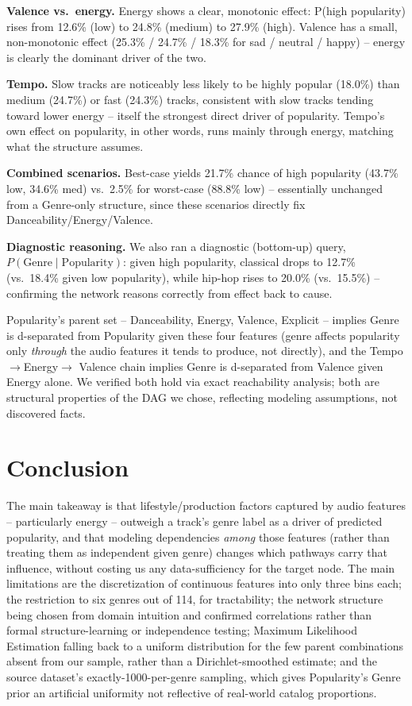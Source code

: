 \documentclass[letterpaper]{article}
\begin{document}
\textbf{Valence vs.\ energy.} Energy shows a clear, monotonic effect:
P(high popularity) rises from 12.6\% (low) to 24.8\% (medium) to 27.9\%
(high). Valence has a small, non-monotonic effect (25.3\% / 24.7\% / 18.3\%
for sad / neutral / happy) -- energy is clearly the dominant driver of the
two.

\textbf{Tempo.} Slow tracks are noticeably less likely to be highly popular
(18.0\%) than medium (24.7\%) or fast (24.3\%) tracks, consistent with slow
tracks tending toward lower energy -- itself the strongest direct driver
of popularity. Tempo's own effect on popularity, in other words, runs
mainly through energy, matching what the structure assumes.

\textbf{Combined scenarios.} Best-case yields 21.7\% chance of high
popularity (43.7\% low, 34.6\% med) vs.\ 2.5\% for worst-case (88.8\% low)
-- essentially unchanged from a Genre-only structure, since these
scenarios directly fix Danceability/Energy/Valence.

\textbf{Diagnostic reasoning.} We also ran a diagnostic (bottom-up) query,
$P(\text{Genre} \mid \text{Popularity})$: given high popularity, classical
drops to 12.7\% (vs.\ 18.4\% given low popularity), while hip-hop rises to
20.0\% (vs.\ 15.5\%) -- confirming the network reasons correctly from
effect back to cause.

Popularity's parent set -- Danceability, Energy, Valence, Explicit --
implies Genre is d-separated from Popularity given these four features
(genre affects popularity only \emph{through} the audio features it tends
to produce, not directly), and the Tempo$\rightarrow$Energy$\rightarrow$
Valence chain implies Genre is d-separated from Valence given Energy
alone. We verified both hold via exact reachability analysis; both are
structural properties of the DAG we chose, reflecting modeling
assumptions, not discovered facts.

\section{Conclusion}
The main takeaway is that lifestyle/production factors captured by audio
features -- particularly energy -- outweigh a track's genre label as a
driver of predicted popularity, and that modeling dependencies \emph{among}
those features (rather than treating them as independent given genre)
changes which pathways carry that influence, without costing us any
data-sufficiency for the target node. The main limitations are the
discretization of continuous features into only three bins each; the
restriction to six genres out of 114, for tractability; the network
structure being chosen from domain intuition and confirmed correlations
rather than formal structure-learning or independence testing; Maximum
Likelihood Estimation falling back to a uniform distribution for the few
parent combinations absent from our sample, rather than a
Dirichlet-smoothed estimate; and the source dataset's exactly-1000-per-genre
sampling, which gives Popularity's Genre prior an artificial uniformity
not reflective of real-world catalog proportions.
\end{document}
